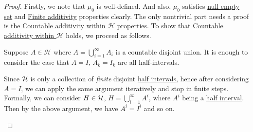 \begin{proof}
	Firstly, we note that \(\mu _0\) is well-defined. And also, \(\mu _0\) satisfies \hyperref[def:pre-measure-null-empty-set]{null empty set} and
	\hyperref[def:pre-measure-finite-additivity]{Finite additivity} properties clearly. The only nontrivial part needs a proof is the
	\hyperref[def:pre-measure-countable-additivity-within-the-algebra]{Countable additivity within \(\mathcal{H}\)} properties.
	To show that \hyperref[def:pre-measure-countable-additivity-within-the-algebra]{Countable additivity within \(\mathcal{H}\)} holds, we proceed as follows.

	Suppose \(A\in \mathcal{H} \) where \(A = \bigcup\limits_{i=1}^{\infty} A_{i}\) is a countable
	disjoint union. It is enough to consider the case that \(A = I\), \(A_{k} = I_{k}\) are all
	half-intervals.
	\begin{remark}
		Since \(\mathcal{\MakeUppercase{H}}\) is only a collection of \emph{finite} disjoint \hyperref[def:half-intervals]{half intervals}, hence
		after considering \(A = I\), we can apply the same argument iteratively and stop in finite steps. Formally, we can consider \(H\in \mathcal{\MakeUppercase{H}} \),
		\(H = \bigcup_{i=1}^{\infty} A^{i}\), where \(A^i\) being a \hyperref[def:half-intervals]{half interval}. Then by the above argument, we have \(A^i = I^i\) and so on.
	\end{remark}


\end{proof}

